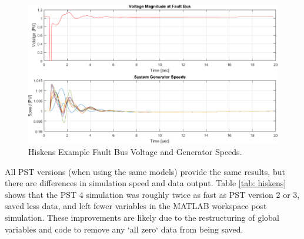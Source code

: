 \begin{figure}[H]
	\centering
	\footnotesize
	\includegraphics[width=\linewidth]{figures/hiskens/hiskensResults}
	\caption{Hiskens Example Fault Bus Voltage and Generator Speeds.}
	\label{fig: hiskens results}
\end{figure}%

All PST versions (when using the same models) provide the same results, but there are differences in simulation speed and data output.
Table \ref{tab: hiskens} shows that the PST 4 simulation was roughly twice as fast as PST version 2 or 3, saved less data, and left fewer variables in the MATLAB workspace post simulation.
These improvements are likely due to the restructuring of global variables and code to remove any `all zero` data from being saved.\\

